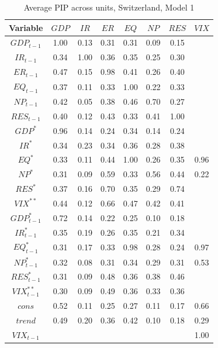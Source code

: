 \documentclass[a4paper, twoside]{templates/ociamthesis}
\begin{document}
\begin{table}[!ht]

\caption{\label{tab:Table55CH1}Average PIP across units, Switzerland, Model 1}
\centering
\fontsize{8}{10}\selectfont
\begin{tabular}[t]{cccccccc}
\toprule
Variable & $GDP$ & $IR$ & $ER$ & $EQ$ & $NP$ & $RES$ & $VIX$\\
\midrule
$GDP_{t-1}$ & 1.00 & 0.13 & 0.31 & 0.31 & 0.09 & 0.15 & \\
$IR_{t-1}$ & 0.34 & 1.00 & 0.36 & 0.35 & 0.25 & 0.30 & \\
$ER_{t-1}$ & 0.47 & 0.15 & 0.98 & 0.41 & 0.26 & 0.40 & \\
$EQ_{t-1}$ & 0.37 & 0.11 & 0.33 & 1.00 & 0.22 & 0.33 & \\
$NP_{t-1}$ & 0.42 & 0.05 & 0.38 & 0.46 & 0.70 & 0.27 & \\
$RES_{t-1}$ & 0.40 & 0.12 & 0.43 & 0.33 & 0.41 & 1.00 & \\
$GDP^*$ & 0.96 & 0.14 & 0.24 & 0.34 & 0.14 & 0.24 & \\
$IR^*$ & 0.34 & 0.23 & 0.34 & 0.36 & 0.28 & 0.38 & \\
$EQ^*$ & 0.33 & 0.11 & 0.44 & 1.00 & 0.26 & 0.35 & 0.96\\
$NP^*$ & 0.31 & 0.09 & 0.59 & 0.33 & 0.56 & 0.44 & 0.22\\
$RES^*$ & 0.37 & 0.16 & 0.70 & 0.35 & 0.29 & 0.74 & \\
$VIX^{**}$ & 0.44 & 0.12 & 0.66 & 0.47 & 0.42 & 0.41 & \\
$GDP^*_{t-1}$ & 0.72 & 0.14 & 0.22 & 0.25 & 0.10 & 0.18 & \\
$IR^*_{t-1}$ & 0.35 & 0.19 & 0.26 & 0.35 & 0.21 & 0.34 & \\
$EQ^*_{t-1}$ & 0.31 & 0.17 & 0.33 & 0.98 & 0.28 & 0.24 & 0.97\\
$NP^*_{t-1}$ & 0.32 & 0.08 & 0.31 & 0.34 & 0.29 & 0.31 & 0.53\\
$RES^*_{t-1}$ & 0.31 & 0.09 & 0.48 & 0.36 & 0.38 & 0.46 & \\
$VIX^{**}_{t-1}$ & 0.30 & 0.09 & 0.49 & 0.36 & 0.33 & 0.36 & \\
$cons$ & 0.52 & 0.11 & 0.25 & 0.27 & 0.11 & 0.17 & 0.66\\
$trend$ & 0.49 & 0.20 & 0.36 & 0.42 & 0.10 & 0.18 & 0.29\\
$VIX_{t-1}$ &  &  &  &  &  &  & 1.00\\
\bottomrule
\end{tabular}
\end{table}
\end{document}
